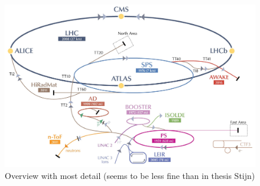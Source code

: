 \begin{figure}[h!t]
 \centering
 \includegraphics[width = 0.99 \textwidth]{Chapters/Chapter2_CERN/Figures/CERNAcceleratorComplex_Detail.jpg}
 \caption{Overview with most detail (seems to be less fine than in thesis Stijn)} \label{fig::LHCChain}
\end{figure}


